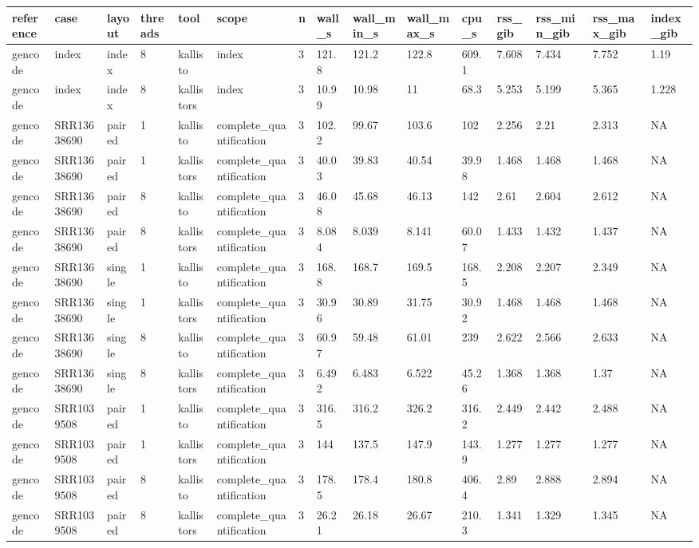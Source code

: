 \begin{tabular}{lllllllllllllll}
\toprule
reference & case & layout & threads & tool & scope & n & wall\_s & wall\_min\_s & wall\_max\_s & cpu\_s & rss\_gib & rss\_min\_gib & rss\_max\_gib & index\_gib \\
\midrule
gencode & index & index & 8 & kallisto & index & 3 & 121.8 & 121.2 & 122.8 & 609.1 & 7.608 & 7.434 & 7.752 & 1.19 \\
gencode & index & index & 8 & kallistors & index & 3 & 10.99 & 10.98 & 11 & 68.3 & 5.253 & 5.199 & 5.365 & 1.228 \\
gencode & SRR13638690 & paired & 1 & kallisto & complete\_quantification & 3 & 102.2 & 99.67 & 103.6 & 102 & 2.256 & 2.21 & 2.313 & NA \\
gencode & SRR13638690 & paired & 1 & kallistors & complete\_quantification & 3 & 40.03 & 39.83 & 40.54 & 39.98 & 1.468 & 1.468 & 1.468 & NA \\
gencode & SRR13638690 & paired & 8 & kallisto & complete\_quantification & 3 & 46.08 & 45.68 & 46.13 & 142 & 2.61 & 2.604 & 2.612 & NA \\
gencode & SRR13638690 & paired & 8 & kallistors & complete\_quantification & 3 & 8.084 & 8.039 & 8.141 & 60.07 & 1.433 & 1.432 & 1.437 & NA \\
gencode & SRR13638690 & single & 1 & kallisto & complete\_quantification & 3 & 168.8 & 168.7 & 169.5 & 168.5 & 2.208 & 2.207 & 2.349 & NA \\
gencode & SRR13638690 & single & 1 & kallistors & complete\_quantification & 3 & 30.96 & 30.89 & 31.75 & 30.92 & 1.468 & 1.468 & 1.468 & NA \\
gencode & SRR13638690 & single & 8 & kallisto & complete\_quantification & 3 & 60.97 & 59.48 & 61.01 & 239 & 2.622 & 2.566 & 2.633 & NA \\
gencode & SRR13638690 & single & 8 & kallistors & complete\_quantification & 3 & 6.492 & 6.483 & 6.522 & 45.26 & 1.368 & 1.368 & 1.37 & NA \\
gencode & SRR1039508 & paired & 1 & kallisto & complete\_quantification & 3 & 316.5 & 316.2 & 326.2 & 316.2 & 2.449 & 2.442 & 2.488 & NA \\
gencode & SRR1039508 & paired & 1 & kallistors & complete\_quantification & 3 & 144 & 137.5 & 147.9 & 143.9 & 1.277 & 1.277 & 1.277 & NA \\
gencode & SRR1039508 & paired & 8 & kallisto & complete\_quantification & 3 & 178.5 & 178.4 & 180.8 & 406.4 & 2.89 & 2.888 & 2.894 & NA \\
gencode & SRR1039508 & paired & 8 & kallistors & complete\_quantification & 3 & 26.21 & 26.18 & 26.67 & 210.3 & 1.341 & 1.329 & 1.345 & NA \\

\end{tabular}

